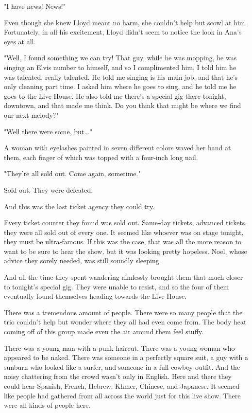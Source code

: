 \documentclass[
]{article}
\begin{document}
"I have news! News!"

Even though she knew Lloyd meant no harm, she couldn't help but scowl at
him. Fortunately, in all his excitement, Lloyd didn't seem to notice the
look in Ana's eyes at all.

"Well, I found something we can try! That guy, while he was mopping, he
was singing an Elvis number to himself, and so I complimented him, I
told him he was talented, really talented. He told me singing is his
main job, and that he's only cleaning part time. I asked him where he
goes to sing, and he told me he goes to the Live House. He also told me
there's a special gig there tonight, downtown, and that made me think.
Do you think that might be where we find our next melody?"

"Well there were some, but..."

A woman with eyelashes painted in seven different colors waved her hand
at them, each finger of which was topped with a four-inch long nail.

"They're all sold out. Come again, sometime."

Sold out. They were defeated.

And this was the last ticket agency they could try.

Every ticket counter they found was sold out. Same-day tickets, advanced
tickets, they were all sold out of every one. It seemed like whoever was
on stage tonight, they must be ultra-famous. If this was the case, that
was all the more reason to want to be sure to hear the show, but it was
looking pretty hopeless. Noel, whose advice they sorely needed, was
still soundly sleeping.

And all the time they spent wandering aimlessly brought them that much
closer to tonight's special gig. They were unable to resist, and so the
four of them eventually found themselves heading towards the Live House.

There was a tremendous amount of people. There were so many people that
the trio couldn't help but wonder where they all had even come from. The
body heat coming off of this group made even the air around them feel
stuffy.

There was a young man with a punk haircut. There was a young woman who
appeared to be naked. There was someone in a perfectly square suit, a
guy with a sunburn who looked like a surfer, and someone in a full
cowboy outfit. And the noisy chattering from the crowd wasn't only in
English. Here and there they could hear Spanish, French, Hebrew, Khmer,
Chinese, and Japanese. It seemed like people had gathered from all
across the world just for this live show. There were all kinds of people
here.
\end{document}

